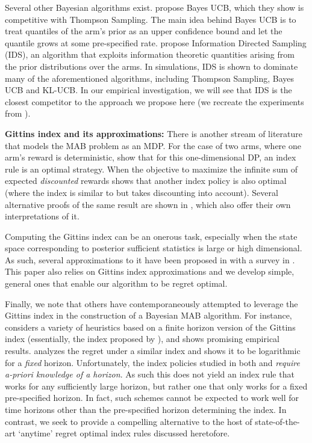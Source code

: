 Several other Bayesian algorithms exist. \cite{kaufmann2012thompson} propose Bayes UCB, which they show is competitive with Thompson Sampling. The main idea behind Bayes UCB is to treat quantiles of the arm's prior as an upper confidence bound and let the quantile grows at some pre-specified rate. \cite{russo2014learning} propose Information Directed Sampling (IDS), an algorithm that exploits information theoretic quantities arising from the prior distributions over the arms. In simulations, IDS is shown to dominate many of the aforementioned algorithms, including Thompson Sampling, Bayes UCB and KL-UCB. In our empirical investigation, we will see that IDS is the closest competitor to the approach we propose here (we recreate the experiments from \cite{russo2014learning}).

\noindent\textbf{\textsf{Gittins index and its approximations: }}
There is another stream of literature that models the MAB problem as an MDP. For the case of two arms, where one arm's reward is deterministic, \cite{bradt1956sequential} show that for this one-dimensional DP, an index rule is an optimal strategy. When the objective to maximize the infinite sum of expected \emph{discounted} rewards \cite{gittins1979bandit} shows that another index policy is also optimal (where the index is similar to \citep{bradt1956sequential} but takes discounting into account). Several alternative proofs of the same result are shown in \citep{tsitsiklis1994short,weber1992gittins,whittle1980multi,bertsimas1996conservation}, which also offer their own interpretations of it. 
 
Computing the Gittins index can be an onerous task, especially when the state space corresponding to posterior sufficient statistics is large or high dimensional. As such, several approximations to it have been proposed in \citep{yao2006some,katehakis1987multi,varaiya1985extensions} with a survey in \citep{chakravorty2013multi}. This paper also relies on Gittins index approximations and we develop simple, general ones that enable our algorithm to be regret optimal. 

Finally, we note that others have contemporaneously attempted to leverage the Gittins index in the construction of a Bayesian MAB algorithm. For instance, \cite{kaufmann2016bayesian} considers a variety of heuristics based on a finite horizon version of the Gittins index (essentially, the index proposed by \cite{bradt1956sequential}), and shows promising empirical results. \cite{lattimore2016bayesregret} analyzes the regret under a similar index and shows it to be logarithmic for a {\em fixed} horizon. Unfortunately, the index policies studied in both \citep{kaufmann2016bayesian} and \citep{lattimore2016bayesregret} {\em require a-priori knowledge of a horizon}. As such this does not yield an index rule that works for any sufficiently large horizon, but rather one that only works for a fixed pre-specified horizon. In fact, such schemes cannot be expected to work well for time horizons other than the pre-specified horizon determining the index. In contrast, we seek to provide a compelling alternative to the host of state-of-the-art `anytime' regret optimal index rules discussed heretofore.


